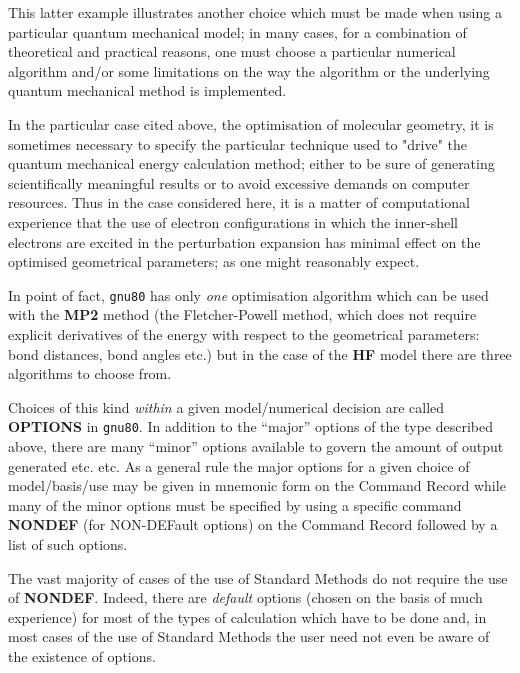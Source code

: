 This latter example illustrates another choice which must be
made when using a particular quantum mechanical model; in many
cases, for a combination of theoretical and practical reasons, one
must choose a particular numerical algorithm and/or some
limitations on the way the algorithm or the underlying quantum
mechanical method is implemented. 

In the particular case cited above,
the optimisation of molecular geometry, it is sometimes necessary to
specify the particular technique used to "drive" the quantum mechanical
energy calculation method; either to be sure of generating scientifically
meaningful results or to avoid excessive demands on computer resources.
Thus in the case considered here, it is a matter of computational
experience that the use of electron configurations in which the
inner-shell electrons are excited in the perturbation expansion has
minimal effect on the optimised geometrical parameters; as one
might reasonably expect. 

In point of fact, {\tt gnu80} has only
{\em one} optimisation algorithm which can be used with the {\bf MP2}
method (the Fletcher-Powell method, which does not require 
explicit derivatives of the energy with respect to the geometrical
parameters: bond distances, bond angles etc.) but in the case of the
{\bf HF} model there are three algorithms to choose from.

Choices of this kind {\em within} a given model/numerical decision
are called {\bf OPTIONS} in {\tt gnu80}. In addition to the ``major''
options of the type described above, there are many ``minor''
options available to govern the amount of output generated etc. etc.
As a general rule the major options for a given choice of
model/basis/use may be given in mnemonic form on the 
Command Record while many of the minor options must be specified
by using a specific command {\bf NONDEF} 
(for NON-DEFault options) on the Command Record followed by
a list of such options. 

The vast majority of cases of the use
of Standard Methods do not require the use of {\bf NONDEF}.
Indeed, there are {\em default} options (chosen on the basis
of much experience) for most of the types of calculation which
have to be done and, in most cases of the use of Standard Methods
the user need not even be aware of the existence of options.

